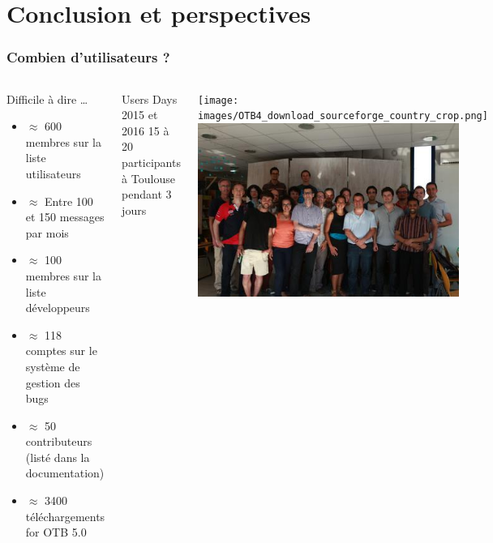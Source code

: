 \documentclass[8pt]{beamer}
\begin{document}
\section{Conclusion et perspectives}
\begin{frame}
\frametitle{Combien d'utilisateurs ?}
\begin{columns}[c]
\begin{block}{Difficile à dire \ldots}
\begin{itemize}
    \item $\approx$ 600 membres sur la liste utilisateurs
    \item $\approx$ Entre 100 et 150 messages par mois
    \item $\approx$ 100 membres sur la liste développeurs
    \item $\approx$ 118 comptes sur le système de gestion des bugs
    \item $\approx$ 50 contributeurs (listé dans la documentation)
    \item $\approx$ 3400 téléchargements for OTB 5.0
  \end{itemize}
\end{block}
\begin{block}{Users Days 2015 et 2016}
  15 à 20 participants à Toulouse pendant 3 jours
\end{block}
\texttt{[image: images/OTB4\_download\_sourceforge\_country\_crop.png]}\\
\includegraphics[width=0.9\textwidth]{images/img_hackfest.jpg}
\end{columns}

\end{frame}
\end{document}
